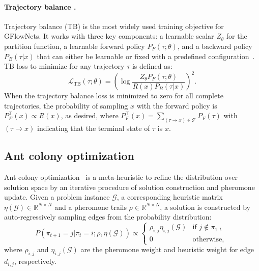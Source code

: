 \documentclass[twoside]{article}
\theoremstyle{plain}
\theoremstyle{definition}
\theoremstyle{remark}
\begin{document}
\paragraph{Trajectory balance \citep{malkin2022trajectory}.} Trajectory balance (TB) is the most widely used training objective for GFlowNets. It works with three key components: a learnable scalar $Z_{\theta}$ for the partition function, a learnable forward policy \(P_F(\tau;\theta)\), and a backward policy \(P_B(\tau|x)\) that can either be learnable or fixed with a predefined configuration~\citep{zhang2022generative}. TB loss to minimize for any trajectory $\tau$ is defined as:
\begin{equation}
\mathcal{L}_{\text{TB}}(\tau;\theta) = \left(\log \frac{Z_\theta P_F(\tau;\theta)}{R(x)P_B(\tau|x)}\right)^2.
\label{eq:tb_loss}\end{equation}
When the trajectory balance loss is minimized to zero for all complete trajectories, the probability of sampling $x$ with the forward policy is \(P_{F}^{\top}(x) \propto R(x)\), as desired, where $P_{F}^{\top}(x) = \sum_{(\tau \rightarrow x) \in \mathcal{T}} P_F(\tau)$ with $(\tau \rightarrow x)$ indicating that the terminal state of $\tau$ is $x$.



\subsection{Ant colony optimization} \label{sec:aco}

Ant colony optimization~\citep[ACO;][]{dorigo2006aco} is a meta-heuristic to refine the distribution over solution space by an iterative procedure of solution construction and pheromone update. Given a problem instance $\mathcal{G}$, a corresponding heuristic matrix $\eta(\mathcal{G}) \in \mathbb{R}^{N \times N}$ and a pheromone trails $\rho \in \mathbb{R}^{N \times N}$, a solution is constructed by auto-regressively sampling edges from the probability distribution:
\begin{equation} \label{eq:aco_prob}
   P(\pi_{t+1} = j|\pi_{t} = i; \rho,\eta(\mathcal{G})) \propto \begin{cases} \rho_{i,j}\eta_{i,j}(\mathcal{G}) & \text{if $j \notin \pi_{1:t}$ }\\ 0 & \text{otherwise},
   \end{cases}  
\end{equation}
where $\rho_{i,j}$ and $\eta_{i,j}(\mathcal{G})$ are the pheromone weight and heuristic weight for edge $d_{i,j}$, respectively.
\end{document}
